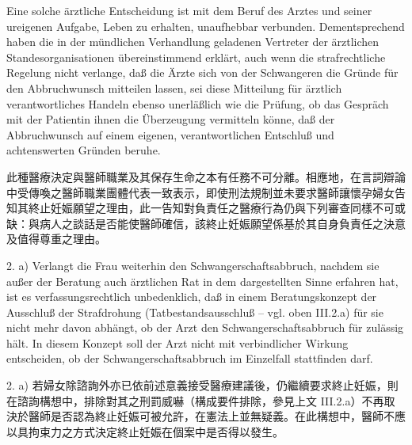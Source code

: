 \documentclass[12pt]{article}
\begin{document}
\begin{sourcepara}[title={原文D.141}]
Eine solche ärztliche Entscheidung ist mit dem Beruf des Arztes und seiner ureigenen Aufgabe, Leben zu erhalten, unaufhebbar verbunden. Dementsprechend haben die in der mündlichen Verhandlung geladenen Vertreter der ärztlichen Standesorganisationen übereinstimmend erklärt, auch wenn die strafrechtliche Regelung nicht verlange, daß die Ärzte sich von der Schwangeren die Gründe für den Abbruchwunsch mitteilen lassen, sei diese Mitteilung für ärztlich verantwortliches Handeln ebenso unerläßlich wie die Prüfung, ob das Gespräch mit der Patientin ihnen die Überzeugung vermitteln könne, daß der Abbruchwunsch auf einem eigenen, verantwortlichen Entschluß und achtenswerten Gründen beruhe.
\end{sourcepara}
\begin{transpara}
此種醫療決定與醫師職業及其保存生命之本有任務不可分離。相應地，在言詞辯論中受傳喚之醫師職業團體代表一致表示，即使刑法規制並未要求醫師讓懷孕婦女告知其終止妊娠願望之理由，此一告知對負責任之醫療行為仍與下列審查同樣不可或缺：與病人之談話是否能使醫師確信，該終止妊娠願望係基於其自身負責任之決意及值得尊重之理由。
\end{transpara}

\begin{sourcepara}[title={原文D.142}]
2. a) Verlangt die Frau weiterhin den Schwangerschaftsabbruch, nachdem sie außer der Beratung auch ärztlichen Rat in dem dargestellten Sinne erfahren hat, ist es verfassungsrechtlich unbedenklich, daß in einem Beratungskonzept der Ausschluß der Strafdrohung (Tatbestandsausschluß -- vgl. oben III.2.a) für sie nicht mehr davon abhängt, ob der Arzt den Schwangerschaftsabbruch für zulässig hält. In diesem Konzept soll der Arzt nicht mit verbindlicher Wirkung entscheiden, ob der Schwangerschaftsabbruch im Einzelfall stattfinden darf.
\end{sourcepara}
\begin{transpara}
2. a) 若婦女除諮詢外亦已依前述意義接受醫療建議後，仍繼續要求終止妊娠，則在諮詢構想中，排除對其之刑罰威嚇（構成要件排除，參見上文 III.2.a）不再取決於醫師是否認為終止妊娠可被允許，在憲法上並無疑義。在此構想中，醫師不應以具拘束力之方式決定終止妊娠在個案中是否得以發生。
\end{transpara}
\end{document}
